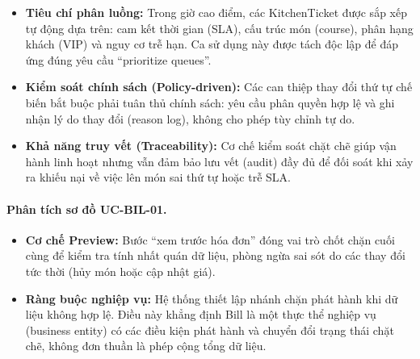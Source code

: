 \begin{itemize}
    \item \textbf{Tiêu chí phân luồng:} Trong giờ cao điểm, các \textsf{KitchenTicket} được sắp xếp tự động dựa trên: cam kết thời gian (SLA), cấu trúc món (course), phân hạng khách (VIP) và nguy cơ trễ hạn. Ca sử dụng này được tách độc lập để đáp ứng đúng yêu cầu \enquote{prioritize queues}.
    
    \item \textbf{Kiểm soát chính sách (Policy-driven):} Các can thiệp thay đổi thứ tự chế biến bắt buộc phải tuân thủ chính sách: yêu cầu phân quyền hợp lệ và ghi nhận lý do thay đổi (reason log), không cho phép tùy chỉnh tự do.
    
    \item \textbf{Khả năng truy vết (Traceability):} Cơ chế kiểm soát chặt chẽ giúp vận hành linh hoạt nhưng vẫn đảm bảo lưu vết (audit) đầy đủ để đối soát khi xảy ra khiếu nại về việc lên món sai thứ tự hoặc trễ SLA.
\end{itemize}



\paragraph{Phân tích sơ đồ UC-BIL-01.}
\begin{itemize}
\item \textbf{Cơ chế Preview:} Bước \enquote{xem trước hóa đơn} đóng vai trò chốt chặn cuối cùng để kiểm tra tính nhất quán dữ liệu, phòng ngừa sai sót do các thay đổi tức thời (hủy món hoặc cập nhật giá).
\item \textbf{Ràng buộc nghiệp vụ:} Hệ thống thiết lập nhánh chặn phát hành khi dữ liệu không hợp lệ. Điều này khẳng định \textsf{Bill} là một thực thể nghiệp vụ (business entity) có các điều kiện phát hành và chuyển đổi trạng thái chặt chẽ, không đơn thuần là phép cộng tổng dữ liệu.
\end{itemize}

